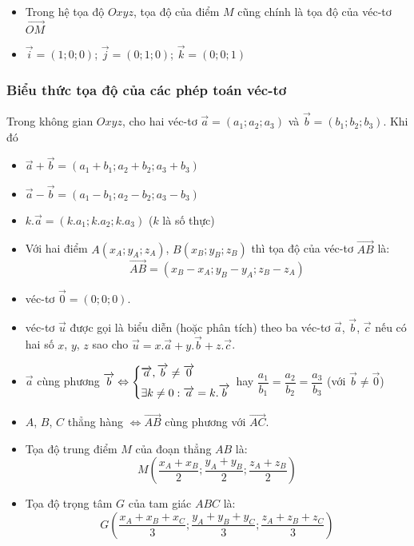 \begin{itemize}
		\item Trong hệ tọa độ $Oxyz$, tọa độ của điểm $M$ cũng chính là tọa độ của véc-tơ $\vec{OM}$
		
				\item $\vec{i}=\left(1;0;0\right)$; $\vec{j}=\left(0;1;0\right)$; $\vec{k}=\left(0;0;1\right)$ 
\end{itemize}

\subsubsection{Biểu thức tọa độ của các phép toán véc-tơ}
Trong không gian $Oxyz$, cho hai véc-tơ $\vec{a}=(a_1;a_2;a_3)$ và $\vec{b}=(b_1;b_2;b_3)$. Khi đó
\begin{dl}\hfil
\begin{itemize}
	\item $\vec{a}+\vec{b}=\left(a_1+b_1;a_2+b_2;a_3+b_3\right)$ 
	\item $\vec{a}-\vec{b}=\left(a_1-b_1;a_2-b_2;a_3-b_3\right)$
	\item 	$k.\vec{a}=\left(k.a_1;k.a_2;k.a_3\right)$ ($k$ là số thực)
\end{itemize}
\end{dl}
\begin{hq}
	\begin{itemize}
	Trong không gian $Oxyz$, cho hai véc-tơ $\vec{a}=(a_1;a_2;a_3)$ và $\vec{b}=(b_1;b_2;b_3)$ khi đó
	$$\boxed{\vec{a}=\vec{b}\Leftrightarrow \heva{	& a_1=b_1 \\ & a_2=b_2 \\ 	& a_3=b_3 \\ 	}}$$
	\item Với hai điểm $A\left(x_A;y_A;z_A\right)$, $B\left(x_B;y_B;z_B\right)$ thì tọa độ của véc-tơ $\vec{AB}$ là:
	$$\boxed{\overrightarrow{AB}=\left(x_B-x_A;y_B-y_A;z_B-z_A\right)}$$
	\item véc-tơ $\vec{0}=\left(0;0;0\right)$.
	\item véc-tơ $\vec{u}$ được gọi là biểu diễn (hoặc phân tích) theo ba véc-tơ $\vec{a}$, $\vec{b}$, $\vec{c}$ nếu có hai số $x$, $y$, $z$ sao cho $\vec{u}=x.\vec{a}+y.\vec{b}+z.\vec{c}$.
	\item $\vec{a}$ cùng phương $\protect\overrightarrow{b}\Leftrightarrow \left\{\begin{aligned}	& \protect\overrightarrow{a},\protect\overrightarrow{b}\ne \protect\overrightarrow{0} \\ & \exists k\ne 0:\protect\overrightarrow{a}=k.\protect\overrightarrow{b} \\ \end{aligned}\right.$ hay $\dfrac{a_1}{b_1}=\dfrac{a_2}{b_2}=\dfrac{a_3}{b_3}$ (với $\vec{b}\ne \vec{0}$)
	\item $A$, $B$, $C$ thẳng hàng $\Leftrightarrow \vec{AB}$ cùng phương với $\vec{AC}$.
	\item Tọa độ trung điểm $M$ của đoạn thẳng $AB$ là: $$M\left(\dfrac{x_A+x_B}{2};\dfrac{y_A+y_B}{2};\dfrac{z_A+z_B}{2}\right)$$
	\item Tọa độ trọng tâm $G$ của tam giác $ABC$ là:	$$G\left(\dfrac{x_A+x_B+x_C}{3};\dfrac{y_A+y_B+y_C}{3};\dfrac{z_A+z_B+z_C}{3}\right)$$
	\end{itemize}
\end{hq}
